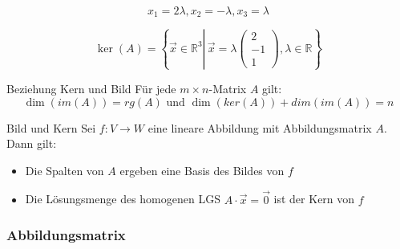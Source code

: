 \begin{example}

    $$
    x_{1}=2 \lambda, x_{2}=-\lambda, x_{3}=\lambda
    $$

    $$
    \operatorname{ker}(A)=\left\{\vec{x} \in \mathbb{R}^{3} \left\lvert\, \vec{x}=\lambda\left(\begin{array}{c}
    2 \\
    -1 \\
    1
    \end{array}\right)\right., \lambda \in \mathbb{R}\right\}
    $$
\end{example}

\begin{theorem}{Beziehung Kern und Bild}
    Für jede $m\times n$-Matrix $A$ gilt:
    \begin{equation*}
         \dim(im(A))=rg(A)\text{ und } \dim(ker(A))+dim(im(A))=n
    \end{equation*}
\end{theorem}

\begin{theorem}{Bild und Kern}
    Sei $f: V \rightarrow W$ eine lineare Abbildung mit Abbildungsmatrix $A$. Dann gilt:
    \begin{itemize}
        \item Die Spalten von $A$ ergeben eine Basis des Bildes von $f$
        \item Die Lösungsmenge des homogenen LGS $A \cdot \vec{x} = \overrightarrow{0}$ ist der Kern von $f$
    \end{itemize}
\end{theorem}

\subsubsection*{Abbildungsmatrix}


